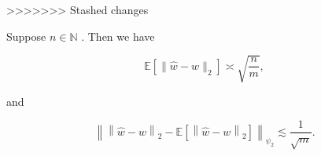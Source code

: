 \documentclass{article}
\begin{document}
>>>>>>> Stashed changes
\begin{theorem}
\label{Characterisation of Estimation Error}
Suppose  $n \in \mathbb{N}$ . Then we have


\begin{equation*}
\mathbb{E}\left[\|\widehat{w}-w\|_2\right] \asymp \sqrt{\frac{n}{m}},
\end{equation*}

and


\begin{equation*}
\left\lVert \left\lVert \widehat{w} - w \right\rVert_2 - \mathbb{E}\left[\left\lVert \widehat{w} - w \right\rVert_2 \right] \right\rVert_{\psi_2} \lesssim  \frac{1}{\sqrt{ m }}.
\end{equation*}


\end{theorem}
\end{document}

